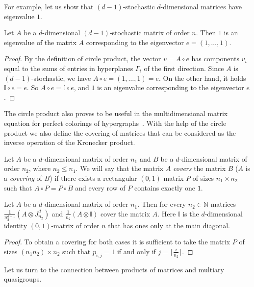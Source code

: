 \documentclass[a4paper]{article}
\begin{document}
For example, let us show that $(d-1)$-stochastic $d$-dimensional matrices have eigenvalue $1$. 


\begin{utv} \label{eigenstoch}
Let $A$ be a $d$-dimensional $(d-1)$-stochastic matrix of order $n$. Then $1$ is an eigenvalue of the matrix $A$ corresponding to the eigenvector $e = (1, \ldots, 1)$. 
\end{utv} 

\begin{proof}
By the definition of circle product, the vector $v = A \circ e$ has components $v_i$ equal to the sums of entries in hyperplanes $\Gamma_i$ of the first  direction. Since $A$ is $(d-1)$-stochastic, we have $A \circ e = (1, \ldots, 1) = e$. On the other hand, it holds $\mathbb{I} \circ e = e$. So $A \circ e =  \mathbb{I} \circ e$, and $1$ is an eigenvalue corresponding to the eigenvector $e$. 
\end{proof}


The circle product also proves to be useful  in the multidimensional matrix equation for perfect colorings of hypergraphs~\cite{my.hyperperfcolor}.  With the help of the circle product  we also define the covering  of matrices that can be considered as the inverse operation of the Kronecker product.

Let $A$ be a $d$-dimensional matrix of order $n_1$ and $B$ be a $d$-dimensional matrix of order $n_2$,  where $n_2 \leq n_1$. We will say that the matrix $A$ \textit{covers} the matrix $B$ ($A$ is a \textit{covering} of $B$) if there exists a rectangular $(0,1)$-matrix $P$ of sizes $n_1 \times n_2$ such that $A \circ P = P \circ B$ and every row of $P$ contains exactly one $1$. 


\begin{utv}
Let $A$ be a $d$-dimensional matrix of order $n_1$. Then for every $n_2 \in \mathbb{N}$ matrices $ \frac{1}{n_2^{d-1}}(A \otimes  J^{d}_{n_2})$   and $\frac{1}{n_2}(A \otimes  \mathbb{I})$ cover the matrix $A$. Here $\mathbb{I}$ is the $d$-dimensional identity $(0,1)$-matrix of order $n$ that  has ones only at the main diagonal.  
\end{utv}

\begin{proof}
To obtain a covering for both cases it is sufficient to take the matrix $P$ of sizes $(n_1n_2) \times n_2$ such that  $p_{i,j} =1$ if and only if $j = \lceil \frac{i}{n_2} \rceil$.
\end{proof}


Let us turn to the connection between products of matrices and multiary quasigroups. 
\end{document}
